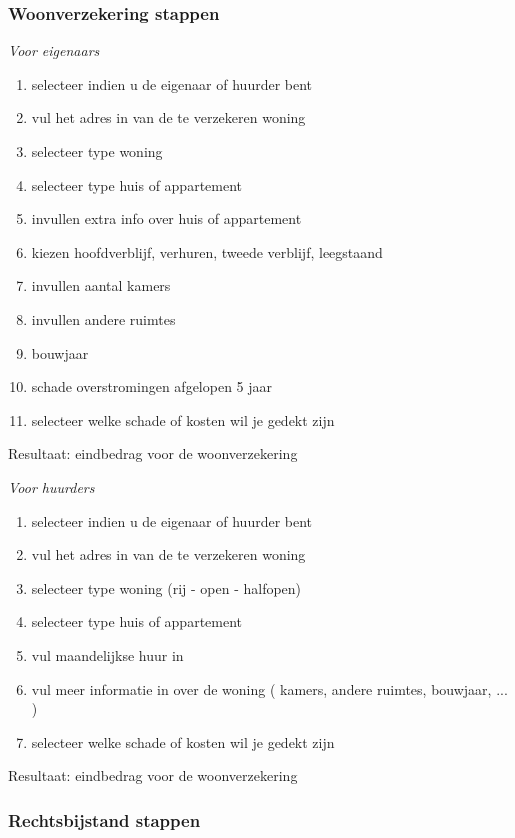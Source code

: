 \subsubsection{Woonverzekering stappen}
\emph{Voor eigenaars}

\begin{enumerate}[label=Stap \arabic*:]
	\item selecteer indien u de eigenaar of huurder bent
	\item vul het adres in van de te verzekeren woning
	\item selecteer type woning
	\item selecteer type huis of appartement
	\item invullen extra info over huis of appartement
	\item kiezen hoofdverblijf, verhuren, tweede verblijf, leegstaand
	\item invullen aantal kamers
	\item invullen andere ruimtes
	\item bouwjaar
	\item schade overstromingen afgelopen 5 jaar
	\item selecteer welke schade of kosten wil je gedekt zijn
\end{enumerate}      
Resultaat: eindbedrag voor de woonverzekering

\emph{Voor huurders}

\begin{enumerate}[label=Stap \arabic*:]
	\item selecteer indien u de eigenaar of huurder bent
	\item vul het adres in van de te verzekeren woning
	\item selecteer type woning (rij - open - halfopen)
	\item selecteer type huis of appartement
	\item vul maandelijkse huur in
	\item vul meer informatie in over de woning ( kamers, andere ruimtes, bouwjaar, ... )
	\item selecteer welke schade of kosten wil je gedekt zijn
\end{enumerate}
Resultaat: eindbedrag voor de woonverzekering

\subsubsection{Rechtsbijstand stappen}



